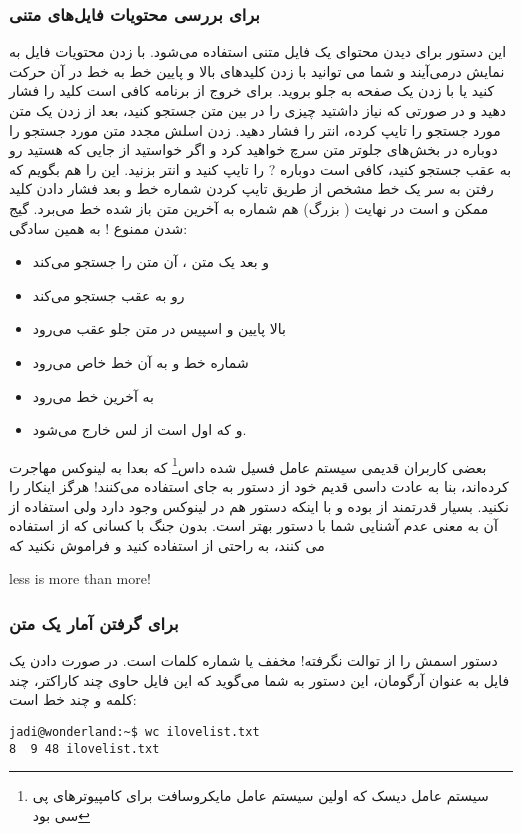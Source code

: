 \subsubsection*{
 برای بررسی محتویات فایل‌های متنی}
این دستور برای دیدن محتوای یک فایل متنی استفاده می‌شود. با زدن 
 محتویات فایل به نمایش درمی‌آیند و شما می توانید با زدن کلیدهای بالا و پایین خط به خط در آن حرکت کنید یا با زدن 
 یک صفحه به جلو بروید. برای خروج از برنامه 
 کافی است کلید  را فشار دهید و در صورتی که نیاز داشتید چیزی را در بین متن جستجو کنید، بعد از زدن یک \lr{/} متن مورد جستجو را تایپ کرده، انتر را فشار دهید. زدن اسلش مجدد متن مورد جستجو را دوباره در بخش‌های جلوتر متن سرچ خواهید کرد و اگر خواستید از جایی که هستید رو به عقب جستجو کنید، کافی است دوباره ? را تایپ کنید و انتر بزنید. این را هم بگویم که رفتن به سر یک خط مشخص از طریق تایپ کردن شماره خط و بعد فشار دادن کلید  ممکن و است در نهایت  ( بزرگ) هم شماره به آخرین متن باز شده خط می‌برد.
گیج شدن ممنوع ! به همین سادگی:
\begin{itemize}
	\item \lr{/} و بعد یک متن ، آن متن را جستجو می‌کند
	\item {} رو به عقب جستجو می‌کند
	\item بالا پایین و اسپیس در متن جلو عقب می‌رود
	\item شماره خط و  به آن خط خاص می‌رود
	\item {} به آخرین خط می‌رود
	\item و  که اول 
 است از لس خارج می‌شود.
\end{itemize}
بعضی کاربران قدیمی سیستم عامل فسیل شده
داس\footnote{سیستم عامل دیسک که اولین سیستم عامل مایکروسافت برای کامپیوترهای پی سی بود}
که بعدا به لینوکس مهاجرت کرده‌اند، بنا به عادت داسی قدیم خود از دستور 
 به جای 
 استفاده می‌کنند! هرگز اینکار را نکنید.
 بسیار قدرتمند از 
 بوده و با اینکه دستور 
 هم در لینوکس وجود دارد ولی استفاده از آن به معنی عدم آشنایی شما با دستور بهتر 
 است. بدون جنگ با کسانی که از 
 استفاده می کنند، به راحتی از 
 استفاده کنید و فراموش نکنید که
\begin{eng}
less is more than more!
\end{eng}

\subsubsection*{ برای گرفتن آمار یک متن}
دستور  اسمش را از توالت نگرفته!  مخفف 
 یا شماره کلمات است. در صورت دادن یک فایل به عنوان آرگومان، این دستور به شما می‌گوید که این فایل حاوی چند کاراکتر، چند کلمه و چند خط است:
\begin{frameng}
\begin{lstlisting}
jadi@wonderland:~$ wc ilovelist.txt 
8  9 48 ilovelist.txt
\end{lstlisting}
\end{frameng}

